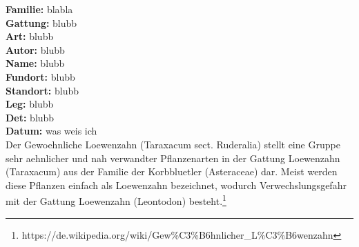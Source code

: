 \documentclass[12pt,a4paper]{article}
\begin{document}
\begin{multicols*}{2}
\vfill\null
{}

\columnbreak\vspace*{\fill}
\noindent\textbf{Familie: } blabla\\
\textbf{Gattung: } blubb\\
\textbf{Art: } blubb\\
\textbf{Autor: } blubb\\
\textbf{Name: } blubb\\
\textbf{Fundort: } blubb\\
\textbf{Standort: } blubb\\
\textbf{Leg: } blubb\\
\textbf{Det: } blubb\\
\textbf{Datum: } was weis ich\\
{\footnotesize Der Gewoehnliche Loewenzahn (Taraxacum sect. Ruderalia) stellt eine Gruppe sehr aehnlicher und nah verwandter Pflanzenarten in der Gattung Loewenzahn (Taraxacum) aus der Familie der Korbbluetler (Asteraceae) dar. Meist werden diese Pflanzen einfach als Loewenzahn bezeichnet, wodurch Verwechslungsgefahr mit der Gattung Loewenzahn (Leontodon) besteht.\footnote{https://de.wikipedia.org/wiki/Gew\%C3\%B6hnlicher\_L\%C3\%B6wenzahn}
}\end{multicols*}
\newpage
\end{document}
